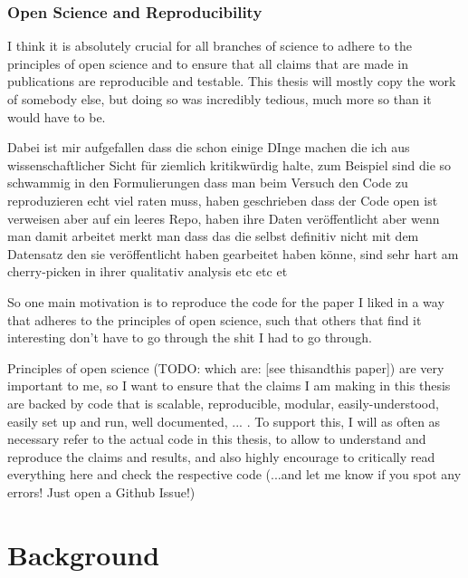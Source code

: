 \documentclass[11pt,
  paper=a4, 
  hidelinks,
  bibliography=totocnumbered,
	captions=tableheading,
	BCOR=10mm
]{scrreprt}
\theoremstyle{definition}
\begin{document}
\subsection{Open Science and Reproducibility}

I think it is absolutely crucial for all branches of science to adhere to the principles of open science and to ensure that all claims that are made in publications are reproducible and testable. This thesis will mostly copy the work of somebody else, but doing so was incredibly tedious, much more so than it would have to be.

Dabei ist mir aufgefallen dass die schon einige DInge machen die ich aus wissenschaftlicher Sicht für ziemlich kritikwürdig halte, zum Beispiel sind die so schwammig in den Formulierungen dass man beim Versuch den Code zu reproduzieren echt viel raten muss, haben geschrieben dass der Code open ist verweisen aber auf ein leeres Repo, haben ihre Daten veröffentlicht aber wenn man damit arbeitet merkt man dass das die selbst definitiv nicht mit dem Datensatz den sie veröffentlicht haben gearbeitet haben könne, sind sehr hart am cherry-picken in ihrer qualitativ  analysis etc etc et

So one main motivation is to reproduce the code for the paper I liked in a way that adheres to the principles of open science, such that others that find it interesting don't have to go through the shit I had to go through.

Principles of open science (TODO: which are: [see thisandthis paper]) are very important to me, so I want to ensure that the claims I am making in this thesis are backed by code that is scalable, reproducible, modular, easily-understood, easily set up and run, well documented, ... . To support this, I will as often as necessary refer to the actual code in this thesis, to allow to understand and reproduce the claims and results, and also highly encourage to critically read everything here and check the respective code (...and let me know if you spot any errors! Just open a Github Issue!)



\chapter{Background}
\end{document}
